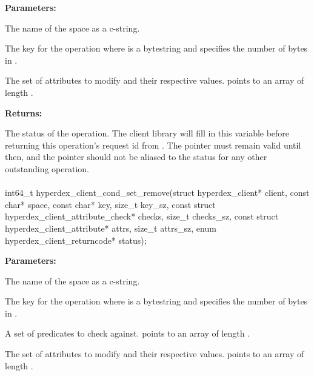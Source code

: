 \noindent\textbf{Parameters:}
\begin{description}[labelindent=\widthof{{\code{attrs}, \code{attrs\_sz}}},leftmargin=*,noitemsep,nolistsep,align=right]
\item[\code{space}] The name of the space as a c-string.
\item[\code{key}, \code{key\_sz}] The key for the operation where  is a bytestring and  specifies the number of bytes in .
\item[\code{attrs}, \code{attrs\_sz}] The set of attributes to modify and their respective values.   points to an array of length .
\end{description}

\noindent\textbf{Returns:}
\begin{description}[labelindent=\widthof{{\code{status}}},leftmargin=*,noitemsep,nolistsep,align=right]
\item[\code{status}] The status of the operation.  The client library will fill in this variable before returning this operation's request id from .  The pointer must remain valid until then, and the pointer should not be aliased to the status for any other outstanding operation.
\end{description}

\paragraph{}
\begin{ccode}
int64_t hyperdex_client_cond_set_remove(struct hyperdex_client* client,
                const char* space,
                const char* key, size_t key_sz,
                const struct hyperdex_client_attribute_check* checks, size_t checks_sz,
                const struct hyperdex_client_attribute* attrs, size_t attrs_sz,
                enum hyperdex_client_returncode* status);
\end{ccode}
\funcdesc 

\noindent\textbf{Parameters:}
\begin{description}[labelindent=\widthof{{\code{checks}, \code{checks\_sz}}},leftmargin=*,noitemsep,nolistsep,align=right]
\item[\code{space}] The name of the space as a c-string.
\item[\code{key}, \code{key\_sz}] The key for the operation where  is a bytestring and  specifies the number of bytes in .
\item[\code{checks}, \code{checks\_sz}] A set of predicates to check against.   points to an array of length .
\item[\code{attrs}, \code{attrs\_sz}] The set of attributes to modify and their respective values.   points to an array of length .
\end{description}

